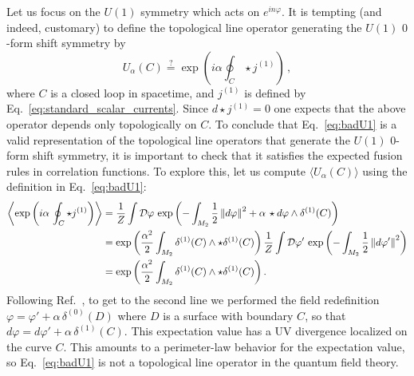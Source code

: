 \documentclass[11pt]{article}
\newcommand{\formabs}[1]{\left\Arrowvert #1 \right\Arrowvert}
\begin{document}
Let us focus on the $U(1)$ symmetry which acts on $e^{i n\varphi}$. It is tempting (and indeed, customary) to define the topological line operator generating the $U(1)$ $0$-form shift symmetry by
\begin{equation}
U_\alpha(C) \stackrel{?}{=} \exp{\left(i \alpha \oint_{C} \star j^{(1)}\right)}\, , 
\label{eq:badU1}
\end{equation}
where $C$ is a closed loop in spacetime, and $j^{(1)}$ is defined by Eq.~\eqref{eq:standard_scalar_currents}. Since $d\star j^{(1)} = 0$ one expects that the above operator depends only topologically on $C$.  To conclude that Eq.~\eqref{eq:badU1} is a valid representation of the topological line operators that generate  the $U(1)$ $0$-form shift symmetry, it is important to check that it satisfies the expected fusion rules in correlation functions.  To explore this, let us compute $\langle U_\alpha(C) \rangle$ using the definition in Eq.~\eqref{eq:badU1}: 
\begin{align}
  \left\langle \exp{\left(i \alpha \,\oint_{C} \star j^{(1)}\right)} \right\rangle &= \frac{1}{Z}  \int\mathcal D\varphi \, \exp{\left(-\int_{M_2}\frac{1}{2}\formabs{d\varphi}^2 + \alpha\,  \star d\varphi\wedge \delta^{(1)}(C)\right)} \nonumber\\
  &= \exp{\left(\frac{\alpha^2}{2} \int_{M_2} \delta^{(1)}(C)\wedge\star \delta^{(1)}(C)\right)}\, \frac{1}{Z}\int\mathcal D\varphi' \, \exp{\left(-\int_{M_2}\frac{1}{2}\formabs{d\varphi'}^2\right)} \nonumber\\
  &= \exp{\left(\frac{\alpha^2}{2} \int_{M_2} \delta^{(1)}(C)\wedge\star \delta^{(1)}(C)\right)}\,. \label{eq:divergence}
\end{align}
 Following Ref.~\cite{Hidaka:2020izy}, to get to the second line we performed the field redefinition $\varphi = \varphi' + \alpha\, \delta^{(0)}(D)$ where $D$ is a surface with boundary $C$, so that $d\varphi= d\varphi' + \alpha\, \delta^{(1)}(C)$. This expectation value has a UV divergence localized on the curve $C$. This amounts to a perimeter-law behavior for the expectation value, so Eq.~\eqref{eq:badU1} is not a topological line operator in the quantum field theory. 
\end{document}
